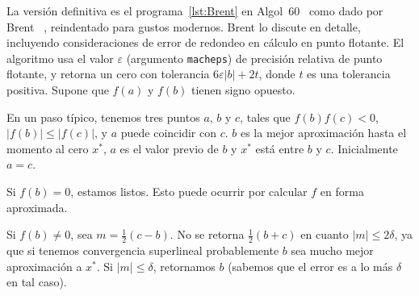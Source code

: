   La versión definitiva es el programa~\ref{lst:Brent} en Algol~60~%
    \cite{backus76:_modif_report_Algol60}
  como dado por Brent~%
    \cite[sección~4.6]{brent71:_algor_guaran_conver_findin_zero_funct},
  reindentado para gustos modernos.
  Brent lo discute en detalle,
  incluyendo consideraciones
  de error de redondeo en cálculo en punto flotante.
  El algoritmo usa el valor \(\varepsilon\)
  (argumento \lstinline[language = {Algol}]!macheps!)
  de precisión relativa de punto flotante,
  y retorna un cero con tolerancia \(6 \varepsilon \lvert b \rvert + 2 t\),
  donde \(t\) es una tolerancia positiva.
  Supone que \(f(a)\) y \(f(b)\) tienen signo opuesto.
  
  En un paso típico,
  tenemos tres puntos  \(a\), \(b\) y \(c\),
  tales que \(f(b) f(c) < 0\),
  \(\lvert f(b) \rvert \le \lvert f(c) \rvert\),
  y \(a\) puede coincidir con \(c\).
  \(b\) es la mejor aproximación hasta el momento al cero \(x^*\),
  \(a\) es el valor previo de \(b\)
  y \(x^*\) está entre \(b\) y \(c\).
  Inicialmente \(a = c\).

  Si \(f(b) = 0\),
  estamos listos.
  Esto puede ocurrir por calcular \(f\) en forma aproximada.

  Si \(f(b) \ne 0\),
  sea \(m = \frac{1}{2} (c - b)\).
  No se retorna \(\frac{1}{2} (b + c)\)
  en cuanto \(\lvert m \rvert \le 2 \delta\),
  ya que si tenemos convergencia superlineal
  probablemente \(b\) sea mucho mejor aproximación a \(x^*\).
  Si \(\lvert m \rvert \le \delta\),
  retornamos \(b\)
  (sabemos que el error es a lo más \(\delta\) en tal caso).

